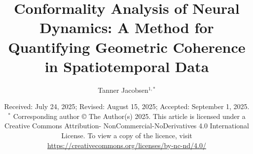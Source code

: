 \documentclass[12pt, reqno]{amsart}
\theoremstyle{definition}
\theoremstyle{remark}
\numberwithin{equation}{section}
\begin{document}
\setcounter{page}{1}


\centerline{}
\centerline{}


\title[Conformality Analysis of Neural Dynamics]{Conformality Analysis of Neural Dynamics: A Method for Quantifying Geometric Coherence in Spatiotemporal Data}

\author[T. Jacobsen]{Tanner Jacobsen$^{1,*}$}

\address{$^{1}$ TNSR-Q, Nashville, TN, USA.}
\email{\textcolor[rgb]{0.00,0.00,0.84}{quantquiplabs@gmail.com}}

\date{Received: July 24, 2025; Revised: August 15, 2025; Accepted: September 1, 2025.
\newline \indent $^{*}$ Corresponding author
\newline \indent © The Author(s) 2025. This article is licensed under a Creative Commons Attribution-
\newline \indent NonCommercial-NoDerivatives 4.0
International License. To view a copy of the licence, visit 
\newline \indent \url{https://creativecommons.org/licenses/by-nc-nd/4.0/}}
\end{document}
